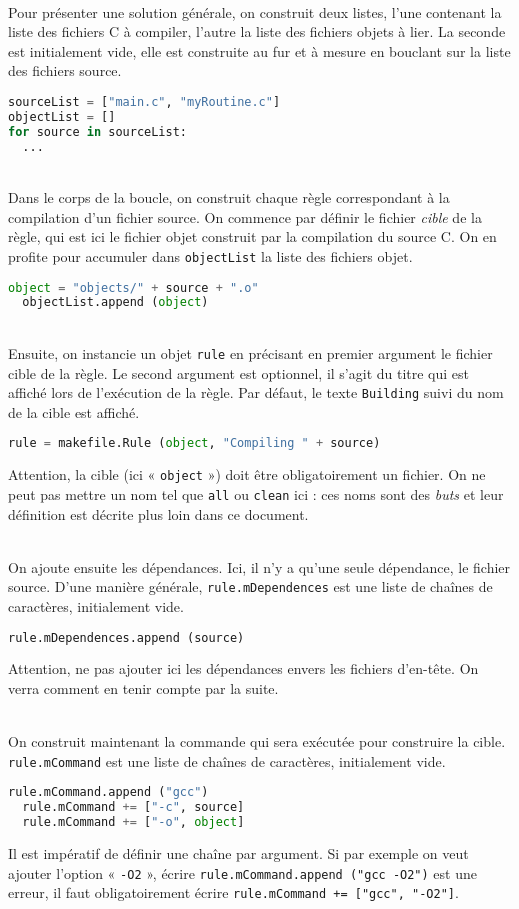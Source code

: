 \documentclass[a4paper,12pt,obeyspaces,openany]{extarticle}
\begin{document}
~\\Pour présenter une solution générale, on construit deux listes, l'une contenant la liste des fichiers C à compiler, l'autre la liste des fichiers objets à lier. La seconde est initialement vide, elle est construite au fur et à mesure en bouclant sur la liste des fichiers source. 
\begin{lstlisting}[language=py]
sourceList = ["main.c", "myRoutine.c"]
objectList = []
for source in sourceList:
  ...
\end{lstlisting}

~\\Dans le corps de la boucle, on construit chaque règle correspondant à la compilation d'un fichier source. On commence par définir le fichier \emph{cible} de la règle, qui est ici le fichier objet construit par la compilation du source C. On en profite pour accumuler dans \texttt{objectList} la liste des fichiers objet.
\begin{lstlisting}[language=py]
  object = "objects/" + source + ".o"
  objectList.append (object)
\end{lstlisting}

~\\Ensuite, on instancie un objet \texttt{rule} en précisant en premier argument le fichier cible de la règle. Le second argument est optionnel, il s'agit du titre qui est affiché lors de l'exécution de la règle. Par défaut, le texte \texttt{Building} suivi du nom de la cible est affiché. 
\begin{lstlisting}[language=py]
  rule = makefile.Rule (object, "Compiling " + source)
\end{lstlisting}
Attention, la cible (ici « \texttt{object} ») doit être obligatoirement un fichier. On ne peut pas mettre un nom tel que \texttt{all} ou \texttt{clean} ici : ces noms sont des \emph{buts} et leur définition est décrite plus loin dans ce document.

~\\On ajoute ensuite les dépendances. Ici, il n'y a qu'une seule dépendance, le fichier source. D'une manière générale, \texttt{rule.mDependences} est une liste de chaînes de caractères, initialement vide.
\begin{lstlisting}[language=py]
  rule.mDependences.append (source)
\end{lstlisting}
Attention, ne pas ajouter ici les dépendances envers les fichiers d'en-tête. On verra comment en tenir compte par la suite.

~\\On construit maintenant la commande qui sera exécutée pour construire la cible. \texttt{rule.mCommand} est une liste de chaînes de caractères, initialement vide.
\begin{lstlisting}[language=py]
  rule.mCommand.append ("gcc")
  rule.mCommand += ["-c", source]
  rule.mCommand += ["-o", object]
\end{lstlisting}
Il est impératif de définir une chaîne par argument. Si par exemple on veut ajouter l'option « \texttt{-O2} », écrire \texttt{rule.mCommand.append ("gcc -O2")} est une erreur, il faut obligatoirement écrire \texttt{rule.mCommand += ["gcc", "-O2"]}.
\end{document}
